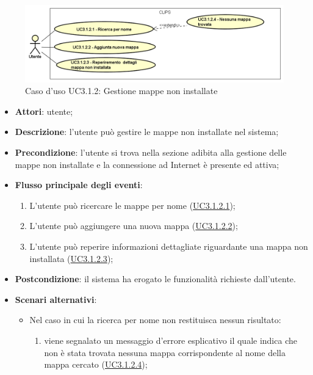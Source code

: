 \documentclass[../AnalisiDeiRequisiti.tex]{subfiles}
\begin{document}
\begin{figure}[H]
	\centering
	\includegraphics[scale=0.95, width=\textwidth]{img/UC3-1-2.png}
	\caption{Caso d'uso UC3.1.2: Gestione mappe non installate}\label{fig:UC3.1.2} 
\end{figure}
\begin{itemize}
	\item \textbf{Attori}: utente;
	\item \textbf{Descrizione}: l'utente può gestire le mappe non installate nel sistema; 
	\item \textbf{Precondizione}: l'utente si trova nella sezione adibita alla gestione delle mappe non installate e la connessione ad Internet è presente ed attiva;
	
	\item \textbf{Flusso principale degli eventi}:
	\begin{enumerate}
		\item L'utente può ricercare le mappe per nome (\hyperlink{UC3.1.2.1}{UC3.1.2.1});
		\item L'utente può aggiungere una nuova mappa (\hyperlink{UC3.1.2.2}{UC3.1.2.2});
		\item L'utente può reperire informazioni dettagliate riguardante una mappa non installata (\hyperlink{UC3.1.2.3}{UC3.1.2.3});
		
	\end{enumerate}
	\item \textbf{Postcondizione}: il sistema ha erogato le funzionalità richieste dall'utente.
	\item \textbf{Scenari alternativi}: 
	\begin{itemize}
		\item Nel caso in cui la ricerca per nome non restituisca nessun risultato: 
		\begin{enumerate}
			\item viene segnalato un messaggio d'errore esplicativo il quale indica che non è stata trovata nessuna mappa corrispondente al nome della mappa cercato (\hyperlink{UC3.1.2.4}{UC3.1.2.4});
		\end{enumerate}
	\end{itemize}
\end{itemize}
\hypertarget{UC3.1.2.1}{}
\end{document}
